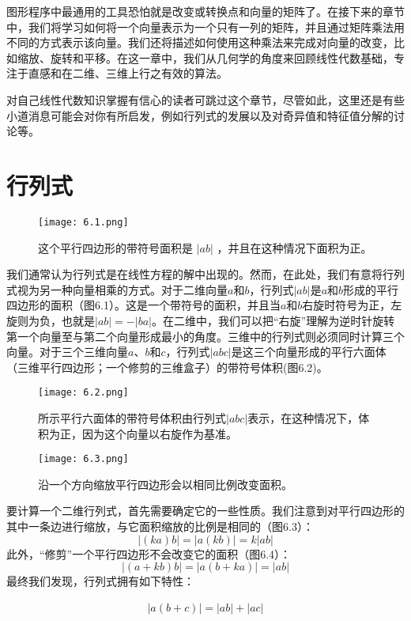 \documentclass[lang=cn,12pt]{elegantbook}
\begin{document}
图形程序中最通用的工具恐怕就是改变或转换点和向量的矩阵了。在接下来的章节中，我们将学习如何将一个向量表示为一个只有一列的矩阵，并且通过矩阵乘法用不同的方式表示该向量。我们还将描述如何使用这种乘法来完成对向量的改变，比如缩放、旋转和平移。在这一章中，我们从几何学的角度来回顾线性代数基础，专注于直感和在二维、三维上行之有效的算法。

对自己线性代数知识掌握有信心的读者可跳过这个章节，尽管如此，这里还是有些小道消息可能会对你有所启发，例如行列式的发展以及对奇异值和特征值分解的讨论等。

\section{行列式}

\begin{figure}[htbp]
\centering
\texttt{[image: 6.1.png]}
\caption{这个平行四边形的带符号面积是 $|ab|$ ，并且在这种情况下面积为正。}
\end{figure}

我们通常认为行列式是在线性方程的解中出现的。然而，在此处，我们有意将行列式视为另一种向量相乘的方式。对于二维向量$a$和$b$，行列式$|ab|$是$a$和$b$形成的平行四边形的面积（图6.1）。这是一个带符号的面积，并且当$a$和$b$右旋时符号为正，左旋则为负，也就是$|ab| = -|ba|$。在二维中，我们可以把“右旋”理解为逆时针旋转第一个向量至与第二个向量形成最小的角度。三维中的行列式则必须同时计算三个向量。对于三个三维向量$a$、$b$和$c$，行列式$|abc|$是这三个向量形成的平行六面体（三维平行四边形；一个修剪的三维盒子）的带符号体积(图6.2)。

\begin{figure}[htbp]
\centering
\texttt{[image: 6.2.png]}
\caption{所示平行六面体的带符号体积由行列式$|abc|$表示，在这种情况下，体积为正，因为这个向量以右旋作为基准。}
\end{figure}

\begin{figure}[htbp]
\centering
\texttt{[image: 6.3.png]}
\caption{沿一个方向缩放平行四边形会以相同比例改变面积。}
\end{figure}

要计算一个二维行列式，首先需要确定它的一些性质。我们注意到对平行四边形的其中一条边进行缩放，与它面积缩放的比例是相同的（图6.3）：$$|(ka)b| =  |a(kb)| = k|ab|$$此外，“修剪”一个平行四边形不会改变它的面积（图6.4）：$$|(a+kb)b| =  |a(b+ka)| = |ab|$$最终我们发现，行列式拥有如下特性：

\begin{align}
|a(b+c)| =  |ab| + |ac|
\end{align}
\end{document}
